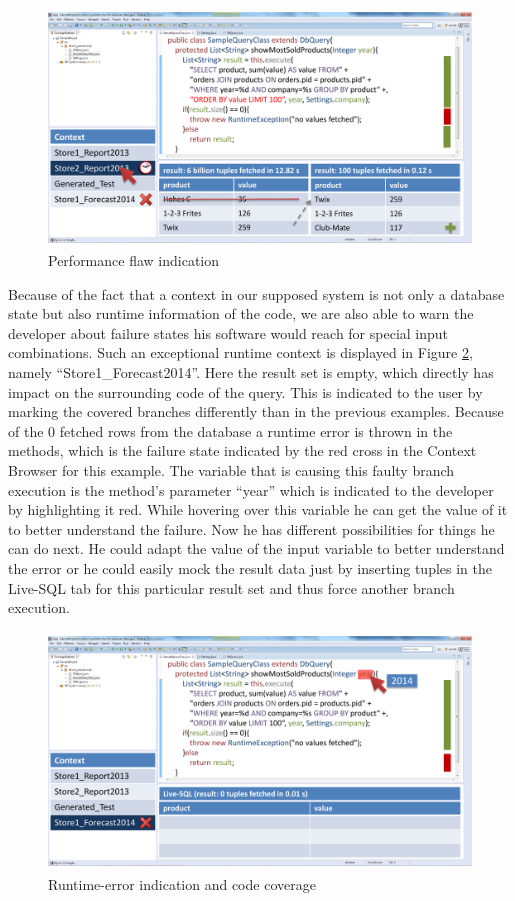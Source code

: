 \begin{figure}
\begin{centering}
    \includegraphics[width=1.0\linewidth]{images/slow}
    \caption{Performance flaw indication}
    \label{fig:final_prototype_slow}
\end{centering}
\end{figure}
Because of the fact that a context in our supposed system is not only a database state but also runtime information of the code, we are also able to warn the developer about failure states his software would reach for special input combinations. Such an exceptional runtime context is displayed in Figure \ref{fig:final_prototype_error}, namely ``Store1\_Forecast2014''. Here the result set is empty, which directly has impact on the surrounding code of the query. This is indicated to the user by marking the covered branches differently than in the previous examples. Because of the 0 fetched rows from the database a runtime error is thrown in the methods, which is the failure state indicated by the red cross in the Context Browser for this example. The variable that is causing this faulty branch execution is the method's parameter ``year'' which is indicated to the developer by highlighting it red. While hovering over this variable he can get the value of it to better understand the failure. Now he has different possibilities for things he can do next. He could adapt the value of the input variable to better understand the error or he could easily mock the result data just by inserting tuples in the Live-SQL tab for this particular result set and thus force another branch execution.\\
\begin{figure}
\begin{centering}
    \includegraphics[width=1.0\linewidth]{images/error}
    \caption{Runtime-error indication and code coverage}
    \label{fig:final_prototype_error}
\end{centering}
\end{figure}